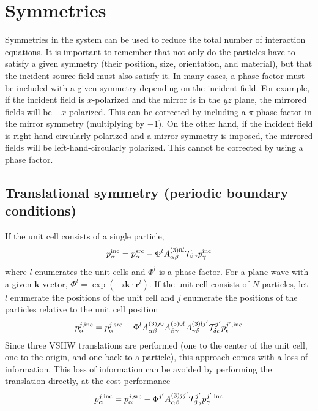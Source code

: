 \documentclass[11pt]{article}
\begin{document}
\section{Symmetries}
Symmetries in the system can be used to reduce the total number of interaction equations.
It is important to remember that not only do the particles have to satisfy a given symmetry (their position, size, orientation, and material), but that the incident source field must also satisfy it.
In many cases, a phase factor must be included with a given symmetry depending on the incident field.
For example, if the incident field is $x$-polarized and the mirror is in the $yz$ plane, the mirrored fields will be $-x$-polarized.
This can be corrected by including a $\pi$ phase factor in the mirror symmetry (multiplying by $-1$).
On the other hand, if the incident field is right-hand-circularly polarized and a mirror symmetry is imposed, the mirrored fields will be left-hand-circularly polarized.
This cannot be corrected by using a phase factor.

\subsection{Translational symmetry (periodic boundary conditions)}
If the unit cell consists of a single particle,
\begin{equation}
    p_{\alpha}^{\text{inc}} = 
    p_{\alpha}^{\text{src}} -
    \Phi^l
    A_{\alpha \beta}^{(3)0l}
    \mathcal{T}_{\beta \gamma}
    p_{\gamma}^{\text{inc}}
\end{equation}
where $l$ enumerates the unit cells and $\Phi^l$ is a phase factor.
For a plane wave with a given $\bm{k}$ vector, $\Phi^l = \exp(-i\bm{k} \cdot \bm{r}^l)$.
If the unit cell consists of $N$ particles, let $l$ enumerate the positions of the unit cell and $j$ enumerate the positions of the particles relative to the unit cell position
\begin{equation}
    p_{\alpha}^{j,\text{inc}} = 
    p_{\alpha}^{j,\text{src}} -
    \Phi^l
    A_{\alpha \beta}^{(3)j 0}
    A_{\beta \gamma}^{(3)0l}
    A_{\gamma \delta}^{(3)l j^\prime}
    \mathcal{T}_{\delta \epsilon}^{j^\prime}
    p_{\epsilon}^{j^\prime,\text{inc}}
\end{equation}
Since three VSHW translations are performed (one to the center of the unit cell, one to the origin, and one back to a particle), this approach comes with a loss of information.
This loss of information can be avoided by performing the translation directly, at the cost performance
\begin{equation}
    p_{\alpha}^{j,\text{inc}} = 
    p_{\alpha}^{j,\text{src}} -
    \Phi^{j^\prime}
    A_{\alpha \beta}^{(3)j j^\prime}
    \mathcal{T}_{\beta \gamma}^{j^\prime}
    p_{\gamma}^{j^\prime,\text{inc}}
\end{equation}
\end{document}
